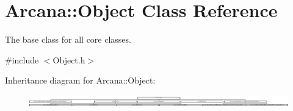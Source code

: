 \hypertarget{class_arcana_1_1_object}{}\section{Arcana\+:\+:Object Class Reference}
\label{class_arcana_1_1_object}


The base class for all core classes.  




{\ttfamily \#include $<$Object.\+h$>$}

Inheritance diagram for Arcana\+:\+:Object\+:\begin{figure}[H]
\begin{center}
\leavevmode
\includegraphics[height=0.534351cm]{class_arcana_1_1_object}
\end{center}
\end{figure}
